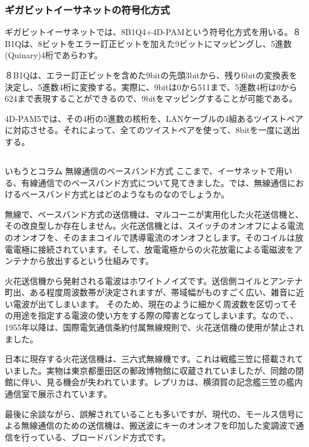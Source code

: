 \subsubsection{ギガビットイーサネットの符号化方式}
ギガビットイーサネットでは、8B1Q4+4D-PAMという符号化方式を用いる。８B1Qは、8ビットをエラー訂正ビットを加えた9ビットにマッピングし、5進数(Quinary)4桁であらわす。

８B1Qは、エラー訂正ビットを含めた9bitの先頭3bitから、残り6bitの変換表を決定し、5進数4桁に変換する。実際に、9bitは0から511まで、5進数4桁は0から624まで表現することができるので、9bitをマッピングすることが可能である。

4D-PAM5では、その4桁の5進数の核桁を、LANケーブルの4組あるツイストペアに対応させる。それによって、全てのツイストペアを使って、8bitを一度に送出する。

\subsection*{}
\begin{itembox}[l]{いもうとコラム 無線通信のベースバンド方式}
ここまで、イーサネットで用いる、有線通信でのベースバンド方式について見てきました。では、無線通信におけるベースバンド方式とはどのようなものなのでしょうか。

無線で、ベースバンド方式の送信機は、マルコーニが実用化した火花送信機と、その改良型しか存在しません。火花送信機とは、スイッチのオンオフによる電流のオンオフを、そのままコイルで誘導電流のオンオフとします。そのコイルは放電電極に接続されています。そして、放電電極からの火花放電による電磁波をアンテナから放出するという仕組みです。

火花送信機から発射される電波はホワイトノイズです。送信側コイルとアンテナ町出、ある程度周波数帯が決定されますが、帯域幅がものすごく広い、雑音に近い電波が出てしまいます。
そのため、現在のように細かく周波数を区切ってその用途を指定する電波の使い方をする際の障害となってしまいます。なので、、1955年以降は、国際電気通信条約付属無線規則で、火花送信機の使用が禁止されました。

日本に現存する火花送信機は、三六式無線機です。これは戦艦三笠に搭載されていました。実物は東京都墨田区の郵政博物館に収蔵されていましたが、同館の閉館に伴い、見る機会が失われています。レプリカは、横須賀の記念艦三笠の艦内通信室で展示されています。

最後に余談ながら、誤解されていることも多いですが、現代の、モールス信号による無線通信のための送信機は、搬送波にキーのオンオフを印加した変調波で通信を行っている、ブロードバンド方式です。
\end{itembox}



